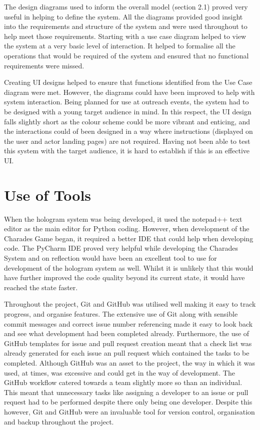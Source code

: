 The design diagrams used to inform the overall model (section 2.1) proved very useful in helping to define the system. All the diagrams provided good insight into the requirements and structure of the system and were used throughout to help meet those requirements. Starting with a use case diagram helped to view the system at a very basic level of interaction. It helped to formalise all the operations that would be required of the system and ensured that no functional requirements were missed.

Creating UI designs helped to ensure that functions identified from the Use Case diagram were met. However, the diagrams could have been improved to help with system interaction. Being planned for use at outreach events, the system had to be designed with a young target audience in mind. In this respect, the UI design falls slightly short as the colour scheme could be more vibrant and enticing, and the interactions could of been designed in a way where instructions (displayed on the user and actor landing pages) are not required. Having not been able to test this system with the target audience, it is hard to establish if this is an effective UI.

\section{Use of Tools}
When the hologram system was being developed, it used the notepad++ text editor as the main editor for Python coding. However, when development of the Charades Game began, it required a better IDE that could help when developing code. The PyCharm IDE proved very helpful while developing the Charades System and on reflection would have been an excellent tool to use for development of the hologram system as well. Whilst it is unlikely that this would have further improved the code quality beyond its current state, it would have reached the state faster.

Throughout the project, Git and GitHub was utilised well making it easy to track progress, and organise features. The extensive use of Git along with sensible commit messages and correct issue number referencing made it easy to look back and see what development had been completed already. Furthermore, the use of GitHub templates for issue and pull request creation meant that a check list was already generated for each issue an pull request which contained the tasks to be completed. Although GitHub was an asset to the project, the way in which it was used, at times, was excessive and could get in the way of development. The GitHub workflow catered towards a team slightly more so than an individual. This meant that unnecessary tasks like assigning a developer to an issue or pull request had to be performed despite there only being one developer. Despite this however, Git and GitHub were an invaluable tool for version control, organisation and backup throughout the project. 

